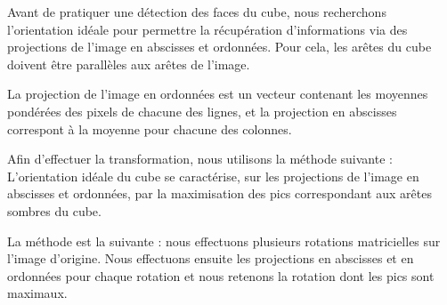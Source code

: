 Avant de pratiquer une détection des faces du cube, nous recherchons l'orientation idéale pour permettre la récupération d'informations via des projections de l'image en abscisses et ordonnées. Pour cela, les arêtes du cube doivent être parallèles aux arêtes de l'image.

La projection de l'image en ordonnées est un vecteur contenant les moyennes pondérées des pixels de chacune des lignes, et la projection en abscisses correspont à la moyenne pour chacune des colonnes.

Afin d'effectuer la transformation, nous utilisons la méthode suivante :
L'orientation idéale du cube se caractérise, sur les projections de l'image en abscisses et ordonnées, par la maximisation des pics correspondant aux arêtes sombres du cube.

La méthode est la suivante : nous effectuons plusieurs rotations matricielles sur l'image d'origine. Nous effectuons ensuite les projections en abscisses et en ordonnées pour chaque rotation et nous retenons la rotation dont les pics sont maximaux.

